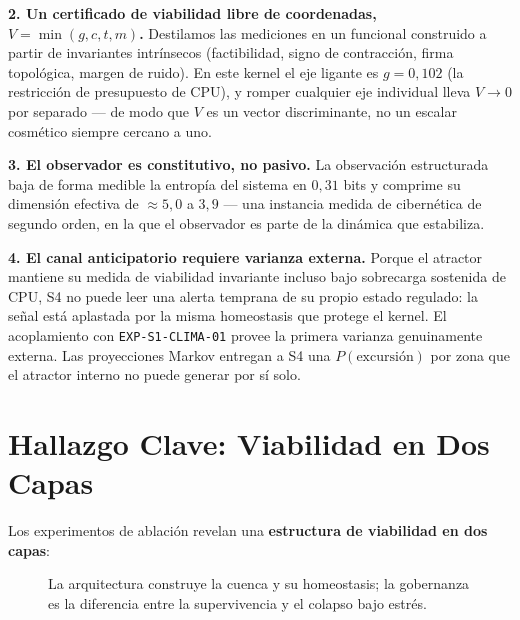 \documentclass[11pt, a4paper]{article}
\begin{document}
\textbf{2. Un certificado de viabilidad libre de coordenadas, $V = \min(g, c, t, m)$.}
Destilamos las mediciones en un funcional construido a partir de invariantes
intrínsecos (factibilidad, signo de contracción, firma topológica, margen de ruido).
En este kernel el eje ligante es $g = 0{,}102$ (la restricción de presupuesto de CPU),
y romper cualquier eje individual lleva $V \to 0$ por separado --- de modo que $V$ es
un vector discriminante, no un escalar cosmético siempre cercano a uno.

\textbf{3. El observador es constitutivo, no pasivo.} La observación estructurada baja
de forma medible la entropía del sistema en $0{,}31$ bits y comprime su dimensión
efectiva de $\approx 5{,}0$ a $3{,}9$ --- una instancia medida de cibernética de
segundo orden, en la que el observador es parte de la dinámica que estabiliza.

\textbf{4. El canal anticipatorio requiere varianza externa.} Porque el atractor
mantiene su medida de viabilidad invariante incluso bajo sobrecarga sostenida de CPU,
S4 no puede leer una alerta temprana de su propio estado regulado: la señal está
aplastada por la misma homeostasis que protege el kernel. El acoplamiento con
\texttt{EXP-S1-CLIMA-01} provee la primera varianza genuinamente externa. Las
proyecciones Markov entregan a S4 una $P(\text{excursión})$ por zona que el atractor
interno no puede generar por sí solo.

\section*{Hallazgo Clave: Viabilidad en Dos Capas}

Los experimentos de ablación revelan una \textbf{estructura de viabilidad en dos
capas}:

\begin{figure}[h]
\centering
{}
\caption{La arquitectura construye la cuenca y su homeostasis; la gobernanza es la
diferencia entre la supervivencia y el colapso bajo estrés.}
\label{fig:dos_capas}
\end{figure}
\end{document}
